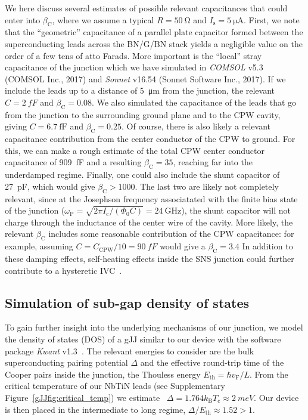 We here discuss several estimates of possible relevant capacitances that could enter into $\beta_\text{C}$, where we assume a typical $R=\SI{50}{\ohm}$ and $I_\text{s}=\SI{5}{\micro\ampere}$.
First, we note that the ``geometric'' capacitance of a parallel plate capacitor formed between the superconducting leads across the BN/G/BN stack yields a negligible value on the order of a few tens of atto Farads.
More important is the ``local'' stray capacitance of the junction which we have simulated in \textit{COMSOL} v5.3 (COMSOL Inc., 2017) and \textit{Sonnet} v16.54 (Sonnet Software Inc., 2017).
If we include the leads up to a distance of \SI{5}{\micro\meter} from the junction, the relevant $C=\SI{2}{fF}$ and $\beta_\text{C}=0.08$.
We also simulated the capacitance of the leads that go from the junction to the surrounding ground plane and to the CPW cavity, giving $C=\SI{6.7}{\femto\farad}$ and $\beta_\text{C}=0.25$.
Of course, there is also likely a relevant capacitance contribution from the center conductor of the CPW to ground.
For this, we can make a rough estimate of the total CPW center conductor capacitance of \SI{909}{fF} and a resulting $\beta_\text{C}=35$, reaching far into the underdamped regime.
Finally, one could also include the shunt capacitor of \SI{27}{pF}, which would give $\beta_\text{C}>1000$. 
The last two are likely not completely relevant, since at the Josephson frequency associatated with the finite bias state of the junction ($\omega_\text{P}=\sqrt{2\pi I_\text{c}/(\Phi_0 C)}=\SI{24}{\giga\hertz}$), the shunt capacitor will not charge through the inductance of the center wire of the cavity. 
More likely, the relevant $\beta_\text{C}$ includes some reasonable contribution of the CPW capacitance: for example, assuming $C = C_\text{CPW} / 10 = \SI{90}{fF}$ would give a $\beta_\text{C} = 3.4$
In addition to these damping effects, self-heating effects inside the SNS junction could further contribute to a hysteretic IVC~\cite{courtoisOriginHysteresisProximity2008a,borzenetsPhononBottleneckGraphenebased2013}.




\subsection{Simulation of sub-gap density of states}\label{sec:subgap}
\noindent To gain further insight into the underlying mechanisms of our junction, we model the density of states (DOS) of a gJJ similar to our device with the software package \textit{Kwant} v1.3~\cite{grothKwantSoftwarePackage2014}.
The relevant energies to consider are the bulk superconducting pairing potential $\Delta$ and the effective round-trip time of the Cooper pairs inside the junction, the Thouless energy $E_\text{th}=\hbar v_\text{F}/L$.
From the critical temperature of our NbTiN leads (see Supplementary Figure~\ref{gJJfig:critical_temp}) we estimate~\cite{tinkhamIntroductionSuperconductivity1996} $\Delta=1.764k_\text{B} T_\text{c}\approx\SI{2}{meV}$.
Our device is then placed in the intermediate to long regime, $\Delta/E_\text{th}\approx1.52>1$.

